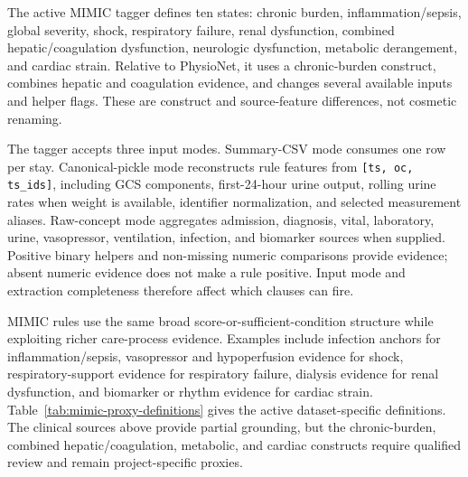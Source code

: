 The active MIMIC tagger defines ten states: chronic burden, inflammation/sepsis, global severity, shock, respiratory failure, renal dysfunction, combined hepatic/coagulation dysfunction, neurologic dysfunction, metabolic derangement, and cardiac strain.  Relative to PhysioNet, it uses a chronic-burden construct, combines hepatic and coagulation evidence, and changes several available inputs and helper flags.  These are construct and source-feature differences, not cosmetic renaming.

The tagger accepts three input modes.  Summary-CSV mode consumes one row per stay.  Canonical-pickle mode reconstructs rule features from \texttt{[ts, oc, ts\_ids]}, including GCS components, first-24-hour urine output, rolling urine rates when weight is available, identifier normalization, and selected measurement aliases.  Raw-concept mode aggregates admission, diagnosis, vital, laboratory, urine, vasopressor, ventilation, infection, and biomarker sources when supplied.  Positive binary helpers and non-missing numeric comparisons provide evidence; absent numeric evidence does not make a rule positive.  Input mode and extraction completeness therefore affect which clauses can fire.

MIMIC rules use the same broad score-or-sufficient-condition structure while exploiting richer care-process evidence.  Examples include infection anchors for inflammation/sepsis, vasopressor and hypoperfusion evidence for shock, respiratory-support evidence for respiratory failure, dialysis evidence for renal dysfunction, and biomarker or rhythm evidence for cardiac strain.  Table~\ref{tab:mimic-proxy-definitions} gives the active dataset-specific definitions.  The clinical sources above provide partial grounding, but the chronic-burden, combined hepatic/coagulation, metabolic, and cardiac constructs require qualified review and remain project-specific proxies.

